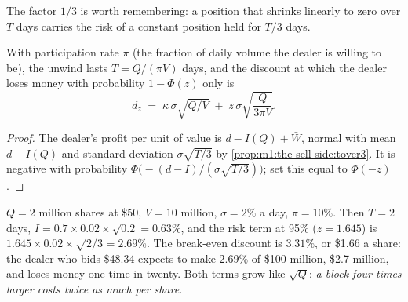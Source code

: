 The factor $1/3$ is worth remembering: a position that shrinks linearly to
zero over $T$ days carries the risk of a constant position held for $T/3$
days.

\begin{proposition}\label{prop:m1:the-sell-side:discount}
With participation rate $\pi$ (the fraction of daily volume the dealer is
willing to be), the unwind lasts $T = Q/(\pi V)$ days, and the discount at
which the dealer loses money with probability $1-\Phi(z)$ only is
\[
  d_z \;=\; \kappa\,\sigma\sqrt{Q/V} \;+\; z\,\sigma\sqrt{\frac{Q}{3\pi V}} .
\]
\end{proposition}
\begin{proof}
The dealer's profit per unit of value is $d - I(Q) + \bar W$, normal with
mean $d - I(Q)$ and standard deviation $\sigma\sqrt{T/3}$ by
\cref{prop:m1:the-sell-side:tover3}. It is negative with probability
$\Phi\bigl(-(d-I)/(\sigma\sqrt{T/3})\bigr)$; set this equal to $\Phi(-z)$.
\end{proof}

\begin{example}\label{ex:m1:the-sell-side:block}
$Q = 2$ million shares at \$50, $V = 10$ million, $\sigma = 2\%$ a day,
$\pi = 10\%$. Then $T = 2$ days, $I = 0.7 \times 0.02 \times \sqrt{0.2} =
0.63\%$, and the risk term at 95\% ($z = 1.645$) is $1.645 \times 0.02
\times \sqrt{2/3} = 2.69\%$. The break-even discount is $3.31\%$, or \$1.66 a
share: the dealer who bids \$48.34 expects to make $2.69\%$ of \$100
million, \$2.7 million, and loses money one time in twenty. Both terms grow
like $\sqrt{Q}$: \emph{a block four times larger costs twice as much per
share.}
\end{example}

\begin{omfigure}

\end{omfigure}

